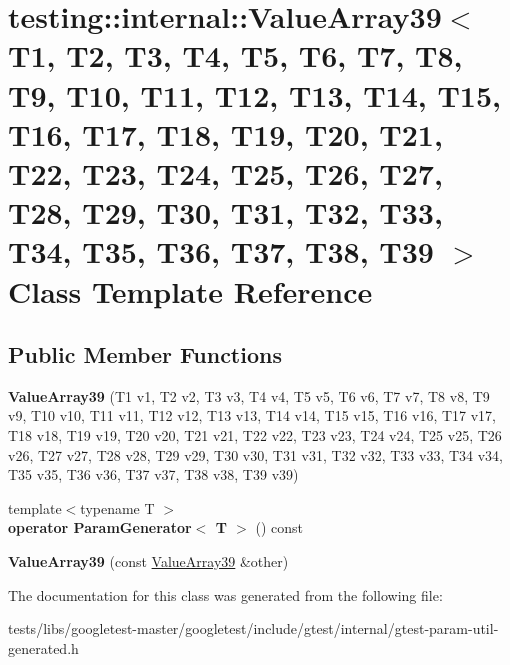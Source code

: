 \hypertarget{classtesting_1_1internal_1_1ValueArray39}{}\section{testing\+:\+:internal\+:\+:Value\+Array39$<$ T1, T2, T3, T4, T5, T6, T7, T8, T9, T10, T11, T12, T13, T14, T15, T16, T17, T18, T19, T20, T21, T22, T23, T24, T25, T26, T27, T28, T29, T30, T31, T32, T33, T34, T35, T36, T37, T38, T39 $>$ Class Template Reference}
\label{classtesting_1_1internal_1_1ValueArray39}
\subsection*{Public Member Functions}
\begin{DoxyCompactItemize}
\item 
\mbox{\label{classtesting_1_1internal_1_1ValueArray39_a4c64f12635a74e291c37d228330fbcb5}} 
{\bfseries Value\+Array39} (T1 v1, T2 v2, T3 v3, T4 v4, T5 v5, T6 v6, T7 v7, T8 v8, T9 v9, T10 v10, T11 v11, T12 v12, T13 v13, T14 v14, T15 v15, T16 v16, T17 v17, T18 v18, T19 v19, T20 v20, T21 v21, T22 v22, T23 v23, T24 v24, T25 v25, T26 v26, T27 v27, T28 v28, T29 v29, T30 v30, T31 v31, T32 v32, T33 v33, T34 v34, T35 v35, T36 v36, T37 v37, T38 v38, T39 v39)
\item 
\mbox{\label{classtesting_1_1internal_1_1ValueArray39_a08fd3f52f9b1dae3de5426196a296a8f}} 
{\footnotesize template$<$typename T $>$ }\\{\bfseries operator Param\+Generator$<$ T $>$} () const
\item 
\mbox{\label{classtesting_1_1internal_1_1ValueArray39_a355e7be366d16631b5119c545bd5f900}} 
{\bfseries Value\+Array39} (const \hyperlink{classtesting_1_1internal_1_1ValueArray39}{Value\+Array39} \&other)
\end{DoxyCompactItemize}


The documentation for this class was generated from the following file\+:\begin{DoxyCompactItemize}
\item 
tests/libs/googletest-\/master/googletest/include/gtest/internal/gtest-\/param-\/util-\/generated.\+h\end{DoxyCompactItemize}
